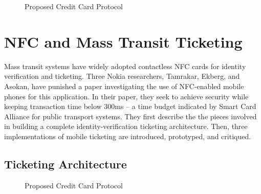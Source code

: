 \documentclass{sig-alternate}
\begin{document}

\begin{figure}
\centering
{}
\caption{Proposed Credit Card Protocol~\cite{CC2016}}
\label{fig:secureCC}
\end{figure}



\section{NFC and Mass Transit Ticketing}
\label{sec:mobile}

Mass transit systems have widely adopted contactless NFC cards for identity verification and ticketing. Three Nokia researchers, Tamrakar, Ekberg, and Asokan, have punished a paper investigating the use of NFC-enabled mobile phones for this application. In their paper, they seek to achieve security while keeping transaction time below 300ms -- a time budget indicated by Smart Card Alliance for public transport systems.
They first describe the the pieces involved in building a complete identity-verification ticketing architecture. Then, three implementations of mobile ticketing are introduced, prototyped, and critiqued.~\cite{Ticket2011}

\subsection{Ticketing Architecture}
\begin{figure}
\centering
{}
\caption{Proposed Credit Card Protocol~\cite{Ticket2011}}
\label{fig:ticketingArch}
\end{figure}
\end{document}
